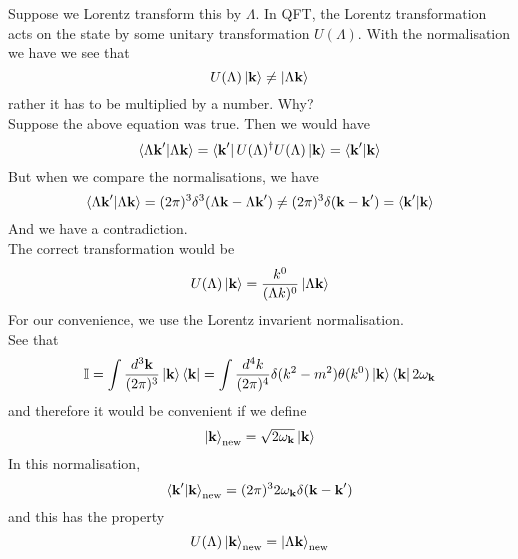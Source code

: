 \documentclass[11pt, notitlepage]{report}
\newcommand{\w}{\omega}
\numberwithin{equation}{section}
\begin{document}
    Suppose we Lorentz transform this by \(\Lambda\). In QFT, the Lorentz transformation acts on the state by some unitary transformation \(U(\Lambda)\). With the normalisation we have we see that 
    \begin{equation*}
        U(\Lambda) \ket{\textbf{k}} \ne \ket{\Lambda \textbf{k}}
    \end{equation*}
    rather it has to be multiplied by a number. Why?\\
    Suppose the above equation was true. Then we would have 
    \begin{equation*}
        \braket{\Lambda \textbf{k}'|\Lambda \textbf{k}} = \bra{\textbf{k}'} U(\Lambda)^\dagger U(\Lambda)\ket{\textbf{k}} = \braket{\textbf{k}'|\textbf{k}}
    \end{equation*}
    But when we compare the normalisations, we have 
    \begin{equation*}
        \braket{\Lambda \textbf{k}'|\Lambda \textbf{k}} = (2\pi)^3 \delta^3(\Lambda \textbf{k} - \Lambda \textbf{k}') \ne (2\pi)^3\delta(\textbf{k} - \textbf{k}') = \braket{\textbf{k}'|\textbf{k}}
    \end{equation*}
    And we have a contradiction.\\
    The correct transformation would be 
    \begin{equation*}
        U(\Lambda) \ket{\textbf{k}} = \frac{k^0}{(\Lambda k)^0}\ket{\Lambda \textbf{k}}
    \end{equation*}
    For our convenience, we use the Lorentz invarient normalisation. \\
    See that 
    \begin{equation*}
        \mathbb{I} = \int \frac{d^3\textbf{k}}{(2\pi)^3} \ket{\textbf{k}}\bra{\textbf{k}} = \int \frac{d^4k}{(2\pi)^4} \delta(k^2 - m^2)\theta(k^0)\ket{\textbf{k}}\bra{\textbf{k}}2\w_\textbf{k}
    \end{equation*}
    and therefore it would be convenient if we define 
    \begin{equation*}
        \ket{\textbf{k}}_{\text{new}} = \sqrt{2\w_\textbf{k}}\ket{\textbf{k}}
    \end{equation*}
    In this normalisation, 
    \begin{equation*}
        \braket{\textbf{k}'|\textbf{k}}_{\text{new}} = (2\pi)^3 2\w_\textbf{k}\delta(\textbf{k} - \textbf{k}')
    \end{equation*}
    and this has the property 
    \begin{equation*}
        U(\Lambda)\ket{\textbf{k}}_{\text{new}} = \ket{\Lambda \textbf{k}}_{\text{new}}
    \end{equation*}
\end{document}
